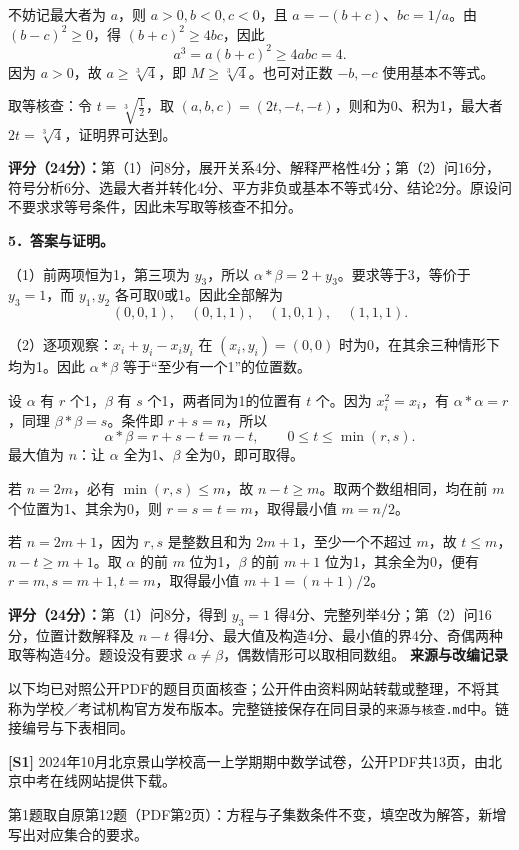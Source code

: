 \documentclass[UTF8,a4paper,11pt]{ctexart}
\begin{document}
不妨记最大者为 $a$，则 $a>0,b<0,c<0$，且 $a=-(b+c)$、$bc=1/a$。由 $(b-c)^2\ge0$，得 $(b+c)^2\ge4bc$，因此
\[a^3=a(b+c)^2\ge4abc=4.\]
因为 $a>0$，故 $a\ge\sqrt[3]{4}$，即 $M\ge\sqrt[3]{4}$。也可对正数 $-b,-c$ 使用基本不等式。

取等核查：令 $t=\sqrt[3]{\frac12}$，取 $(a,b,c)=(2t,-t,-t)$，则和为0、积为1，最大者 $2t=\sqrt[3]{4}$，证明界可达到。

\textbf{评分（24分）：}第（1）问8分，展开关系4分、解释严格性4分；第（2）问16分，符号分析6分、选最大者并转化4分、平方非负或基本不等式4分、结论2分。原设问不要求求等号条件，因此未写取等核查不扣分。

\textbf{5．答案与证明。}

（1）前两项恒为1，第三项为 $y_3$，所以 $\alpha*\beta=2+y_3$。要求等于3，等价于 $y_3=1$，而 $y_1,y_2$ 各可取0或1。因此全部解为
\[(0,0,1),\quad(0,1,1),\quad(1,0,1),\quad(1,1,1).\]

（2）逐项观察：$x_i+y_i-x_iy_i$ 在 $(x_i,y_i)=(0,0)$ 时为0，在其余三种情形下均为1。因此 $\alpha*\beta$ 等于“至少有一个1”的位置数。

设 $\alpha$ 有 $r$ 个1，$\beta$ 有 $s$ 个1，两者同为1的位置有 $t$ 个。因为 $x_i^2=x_i$，有 $\alpha*\alpha=r$，同理 $\beta*\beta=s$。条件即 $r+s=n$，所以
\[\alpha*\beta=r+s-t=n-t,\qquad 0\le t\le\min(r,s).\]
最大值为 $n$：让 $\alpha$ 全为1、$\beta$ 全为0，即可取得。

若 $n=2m$，必有 $\min(r,s)\le m$，故 $n-t\ge m$。取两个数组相同，均在前 $m$ 个位置为1、其余为0，则 $r=s=t=m$，取得最小值 $m=n/2$。

若 $n=2m+1$，因为 $r,s$ 是整数且和为 $2m+1$，至少一个不超过 $m$，故 $t\le m$，$n-t\ge m+1$。取 $\alpha$ 的前 $m$ 位为1，$\beta$ 的前 $m+1$ 位为1，其余全为0，便有 $r=m,s=m+1,t=m$，取得最小值 $m+1=(n+1)/2$。

\textbf{评分（24分）：}第（1）问8分，得到 $y_3=1$ 得4分、完整列举4分；第（2）问16分，位置计数解释及 $n-t$ 得4分、最大值及构造4分、最小值的界4分、奇偶两种取等构造4分。题设没有要求 $\alpha\ne\beta$，偶数情形可以取相同数组。
\newpage
\textbf{来源与改编记录}

以下均已对照公开PDF的题目页面核查；公开件由资料网站转载或整理，不将其称为学校／考试机构官方发布版本。完整链接保存在同目录的\texttt{来源与核查.md}中。链接编号与下表相同。

\textbf{[S1]} 2024年10月北京景山学校高一上学期期中数学试卷，公开PDF共13页，由北京中考在线网站提供下载。

第1题取自原第12题（PDF第2页）：方程与子集数条件不变，填空改为解答，新增写出对应集合的要求。
\end{document}
